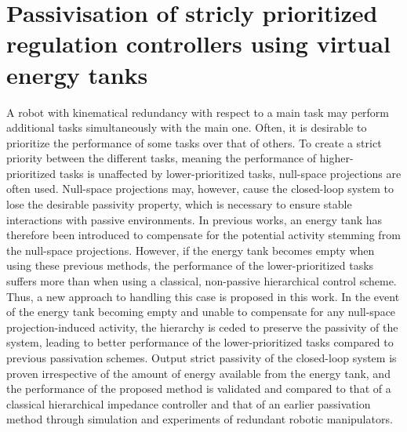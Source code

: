 \documentclass[../main.tex]{subfiles}
\begin{document}
\chapter{Passivisation of stricly prioritized regulation controllers using virtual energy tanks}

A robot with kinematical redundancy with respect to a main task may perform additional tasks simultaneously with the main one. 
    Often, it is desirable to prioritize the performance of some tasks over that of others. 
    To create a strict priority between the different tasks, meaning the performance of higher-prioritized tasks is unaffected by lower-prioritized tasks, null-space projections are often used. 
    Null-space projections may, however, cause the closed-loop system to lose the desirable passivity property, which
    is necessary to ensure stable interactions with passive environments.
    In previous works, an energy tank has therefore been introduced to compensate for the potential activity stemming from the null-space projections. 
    However, if the energy tank becomes empty when using these previous methods, the performance of the lower-prioritized tasks suffers more than when using a classical, non-passive hierarchical control scheme.
    Thus, a new approach to handling 
    this case is proposed in this work. 
    In the event of the energy tank becoming empty and unable to compensate for any null-space projection-induced activity, the hierarchy is ceded to preserve the passivity of the system, leading to better performance of the lower-prioritized tasks compared to previous passivation schemes.
    Output strict passivity of the closed-loop system is proven irrespective of the amount of energy available from the energy tank, and the performance of the proposed method is validated and compared to that of a classical hierarchical impedance controller and that of an earlier passivation method through simulation and experiments of redundant robotic manipulators.
    
\end{document}
